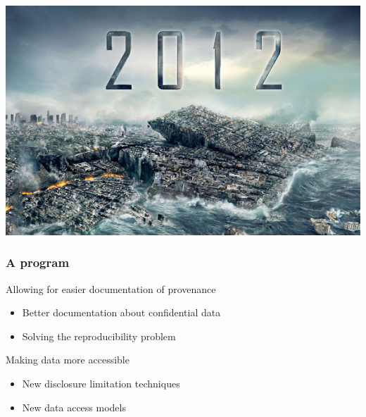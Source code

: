 \begin{frame}
	\centering
	\includegraphics[width=\textwidth]{Best-Natural-Disaster-Movies-Of-Hollywood.jpg}
\end{frame}



\begin{frame}
\frametitle{A program}


\begin{block}{Allowing for easier documentation of provenance}
\begin{itemize}
	\item Better documentation about confidential data
	\item Solving the reproducibility problem
\end{itemize}
\end{block}

\begin{block}{Making data more accessible}
	\begin{itemize}
		\item New disclosure limitation techniques
		\item New data access models
	\end{itemize}
\end{block}
\end{frame}


